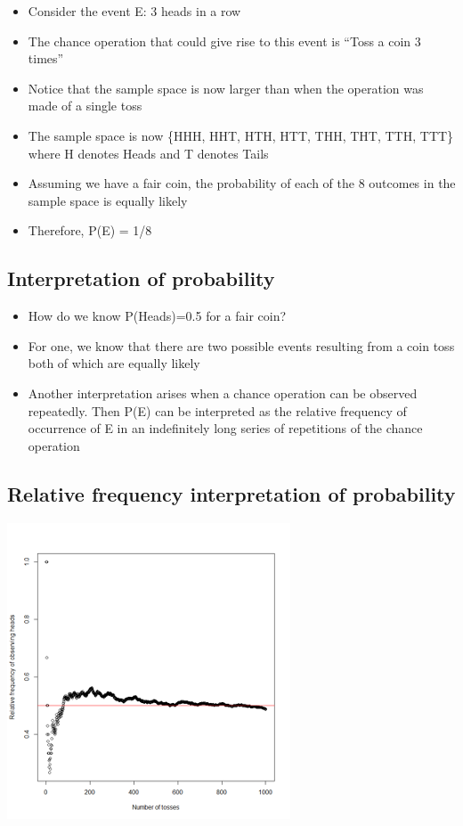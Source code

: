 \documentclass[
]{book}
\providecommand{\tightlist}{%
  \setlength{\itemsep}{0pt}\setlength{\parskip}{0pt}}
\begin{document}
\begin{itemize}
\tightlist
\item
  Consider the event
  E: 3 heads in a row
\item
  The chance operation that could give rise to this event is ``Toss a coin 3 times''
\item
  Notice that the sample space is now larger than when the operation was made of a single toss
\item
  The sample space is now
  \{HHH, HHT, HTH, HTT, THH, THT, TTH, TTT\}
  where H denotes Heads and T denotes Tails
\item
  Assuming we have a fair coin, the probability of each of the 8 outcomes in the sample space is equally likely
\item
  Therefore, P(E) = 1/8
\end{itemize}

\hypertarget{interpretation-of-probability}{%
\subsection{Interpretation of probability}\label{interpretation-of-probability}}

\begin{itemize}
\tightlist
\item
  How do we know P(Heads)=0.5 for a fair coin?
\item
  For one, we know that there are two possible events resulting from a coin toss both of which are equally likely
\item
  Another interpretation arises when a chance operation can be observed repeatedly. Then P(E) can be interpreted as the relative frequency of occurrence of E in an indefinitely long series of repetitions of the chance operation
\end{itemize}

\hypertarget{relative-frequency-interpretation-of-probability}{%
\subsection{Relative frequency interpretation of probability}\label{relative-frequency-interpretation-of-probability}}

\includegraphics[width=0.5\linewidth]{./2_16}
\end{document}
